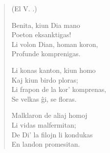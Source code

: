 \begin{verse}
\begin{center}
\footnotesize (El V. .)
\end{center}
                        Benita, kiun Dia mano\\
                        Poeton eksanktigas!\\
                        Li volon Dian, homan koron,\\
                        Profunde komprenigas.

                        Li konas kanton, kiun homo\\
                        Kaj kiun birdo ploras;\\
                        Li frapon de la kor' komprenas,\\
                        Se velkas \^gi, se floras.

                        Malklaron de aliaj homoj\\
                        Li vidas malfermitan;\\
                        De Di' la filojn li kondukas\\
                        En landon promesitan.

\end{verse}

\smallrule{}